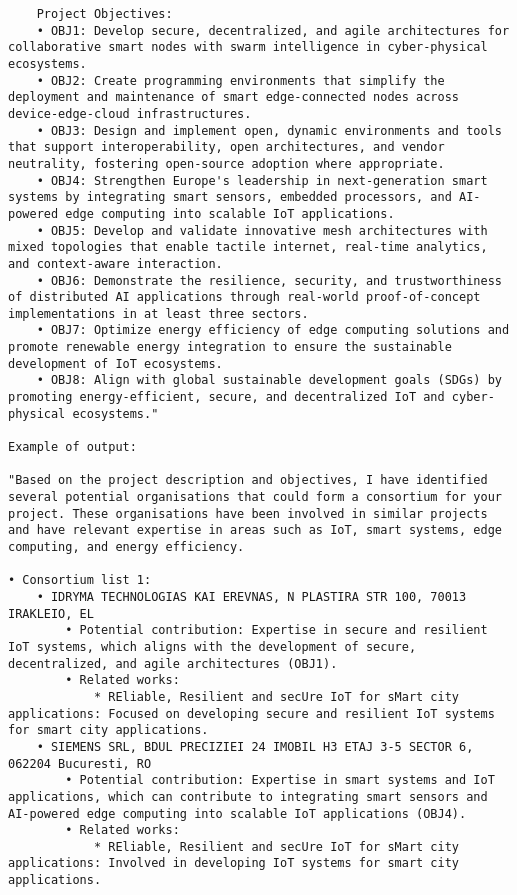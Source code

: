\begin{lstlisting}
    Project Objectives:
    • OBJ1: Develop secure, decentralized, and agile architectures for collaborative smart nodes with swarm intelligence in cyber-physical ecosystems.
    • OBJ2: Create programming environments that simplify the deployment and maintenance of smart edge-connected nodes across device-edge-cloud infrastructures.
    • OBJ3: Design and implement open, dynamic environments and tools that support interoperability, open architectures, and vendor neutrality, fostering open-source adoption where appropriate.
    • OBJ4: Strengthen Europe's leadership in next-generation smart systems by integrating smart sensors, embedded processors, and AI-powered edge computing into scalable IoT applications.
    • OBJ5: Develop and validate innovative mesh architectures with mixed topologies that enable tactile internet, real-time analytics, and context-aware interaction.
    • OBJ6: Demonstrate the resilience, security, and trustworthiness of distributed AI applications through real-world proof-of-concept implementations in at least three sectors.
    • OBJ7: Optimize energy efficiency of edge computing solutions and promote renewable energy integration to ensure the sustainable development of IoT ecosystems.
    • OBJ8: Align with global sustainable development goals (SDGs) by promoting energy-efficient, secure, and decentralized IoT and cyber-physical ecosystems."

Example of output:

"Based on the project description and objectives, I have identified several potential organisations that could form a consortium for your project. These organisations have been involved in similar projects and have relevant expertise in areas such as IoT, smart systems, edge computing, and energy efficiency.

• Consortium list 1:
    • IDRYMA TECHNOLOGIAS KAI EREVNAS, N PLASTIRA STR 100, 70013 IRAKLEIO, EL
        • Potential contribution: Expertise in secure and resilient IoT systems, which aligns with the development of secure, decentralized, and agile architectures (OBJ1).
        • Related works:
            * REliable, Resilient and secUre IoT for sMart city applications: Focused on developing secure and resilient IoT systems for smart city applications.
    • SIEMENS SRL, BDUL PRECIZIEI 24 IMOBIL H3 ETAJ 3-5 SECTOR 6, 062204 Bucuresti, RO
        • Potential contribution: Expertise in smart systems and IoT applications, which can contribute to integrating smart sensors and AI-powered edge computing into scalable IoT applications (OBJ4).
        • Related works:
            * REliable, Resilient and secUre IoT for sMart city applications: Involved in developing IoT systems for smart city applications.


\end{lstlisting}
